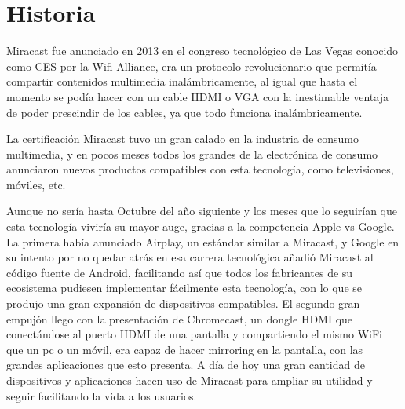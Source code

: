 \section{Historia}

Miracast fue anunciado en 2013 en el congreso tecnológico de Las Vegas conocido como CES por la Wifi Alliance, era un protocolo revolucionario que permitía compartir contenidos multimedia inalámbricamente, al igual que hasta el momento se podía hacer con un cable HDMI o VGA con la inestimable ventaja de poder prescindir de los cables, ya que todo funciona inalámbricamente.

La certificación Miracast tuvo un gran calado en la industria de consumo multimedia, y en pocos meses todos los grandes de la electrónica de consumo anunciaron nuevos productos compatibles con esta tecnología, como televisiones, móviles, etc.

Aunque no sería hasta Octubre del año siguiente y los meses que lo seguirían que esta tecnología viviría su mayor auge, gracias a la competencia Apple vs Google. La primera había anunciado Airplay, un estándar similar a Miracast, y Google en su intento por no quedar atrás en esa carrera tecnológica añadió Miracast al código fuente de Android, facilitando así que todos los fabricantes de su ecosistema pudiesen implementar fácilmente esta tecnología, con lo que se produjo una gran expansión de dispositivos compatibles.
El segundo gran empujón llego con la presentación de Chromecast, un dongle HDMI que conectándose al puerto HDMI de una pantalla y compartiendo el mismo WiFi que un pc o un móvil, era capaz de hacer mirroring en la pantalla, con las grandes aplicaciones que esto presenta.
A día de hoy una gran cantidad de dispositivos y aplicaciones hacen uso de Miracast para ampliar su utilidad y seguir facilitando la vida a los usuarios.
